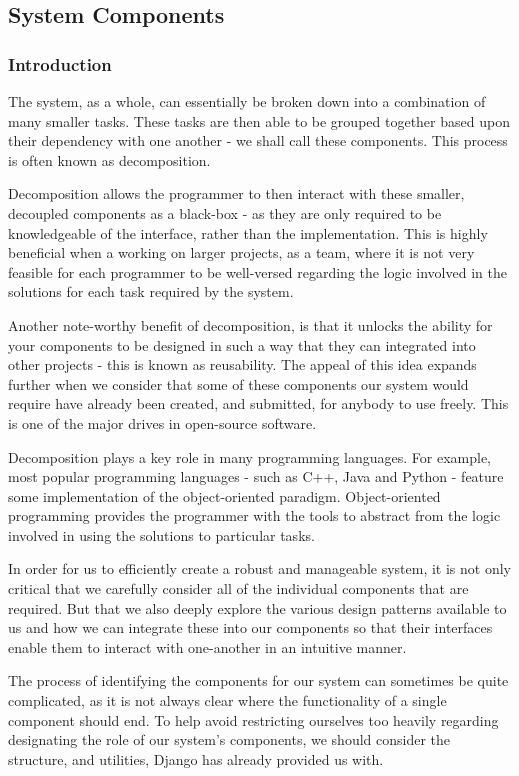 \subsection{System Components}
	\subsubsection{Introduction}
		The system, as a whole, can essentially be broken down into a combination of many smaller tasks. These tasks are then able to be grouped together based upon their dependency with one another - we shall call these components. This process is often known as decomposition.
		
		Decomposition allows the programmer to then interact with these smaller, decoupled components as a black-box - as they are only required to be knowledgeable of the interface, rather than the implementation. This is highly beneficial when a working on larger projects, as a team, where it is not very feasible for each programmer to be well-versed regarding the logic involved in the solutions for each task required by the system.
		
		Another note-worthy benefit of decomposition, is that it unlocks the ability for your components to be designed in such a way that they can integrated into other projects - this is known as reusability. The appeal of this idea expands further when we consider that some of these components our system would require have already been created, and submitted, for anybody to use freely. This is one of the major drives in open-source software.
		
		Decomposition plays a key role in many programming languages. For example, most popular programming languages - such as C++, Java and Python - feature some implementation of the object-oriented paradigm. Object-oriented programming provides the programmer with the tools to abstract from the logic involved in using the solutions to particular tasks.
		
		In order for us to efficiently create a robust and manageable system, it is not only critical that we carefully consider all of the individual components that are required. But that we also deeply explore the various design patterns available to us and how we can integrate these into our components so that their interfaces enable them to interact with one-another in an intuitive manner.
		
		The process of identifying the components for our system can sometimes be quite complicated, as it is not always clear where the functionality of a single component should end. To help avoid restricting ourselves too heavily regarding designating the role of our system's components, we should consider the structure, and utilities, Django has already provided us with.
	
